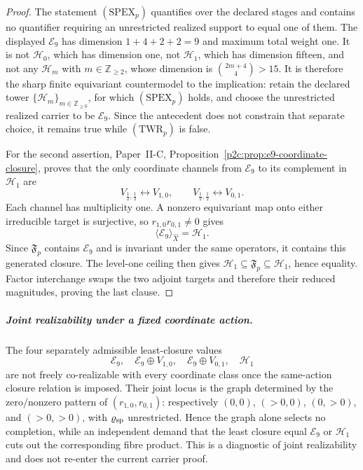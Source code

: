 \documentclass[11pt,a4paper]{article}
\begin{document}
\begin{proof}
The statement \((\mathrm{SPEX}_p)\) quantifies over the declared stages and
contains no quantifier requiring an unrestricted realized support to equal
one of them.  The displayed \(\mathcal E_9\) has dimension
\(1+4+2+2=9\) and maximum total weight one.  It is not
\(\mathcal H_0\), which has dimension one, not \(\mathcal H_1\), which has
dimension fifteen, and not any \(\mathcal H_m\) with
\(m\in\mathbb Z_{\ge2}\), whose
dimension is \(\binom{2m+4}{4}>15\).  It is therefore the sharp finite
equivariant countermodel to the implication: retain the declared tower
\(\{\mathcal H_m\}_{m\in\mathbb Z_{\ge0}}\), for which
\((\mathrm{SPEX}_p)\) holds, and
choose the unrestricted realized carrier to be \(\mathcal E_9\).  Since the
antecedent does not constrain that separate choice, it remains true while
\((\mathrm{TWR}_p)\) is false.

For the second assertion, Paper~II-C,
Proposition~\ref{p2c:prop:e9-coordinate-closure}, proves that the only
coordinate channels from
\(\mathcal E_9\) to its complement in \(\mathcal H_1\) are
\[
 V_{\frac12,\frac12}\longleftrightarrow V_{1,0},
 \qquad
 V_{\frac12,\frac12}\longleftrightarrow V_{0,1}.
\]
Each channel has multiplicity one.  A nonzero equivariant map onto either
irreducible target is surjective, so
\(r_{1,0}r_{0,1}\ne0\) gives
\[
        \langle\mathcal E_9\rangle_{\widehat X}=\mathcal H_1.
\]
Since \(\mathfrak F_p\) contains \(\mathcal E_9\) and is invariant under the
same operators, it contains this generated closure.  The level-one ceiling
then gives
\(\mathcal H_1\subseteq\mathfrak F_p\subseteq\mathcal H_1\), hence equality.
Factor interchange swaps the two adjoint targets and therefore their reduced
magnitudes, proving the last clause.
\end{proof}

\subparagraph{Joint realizability under a fixed coordinate action.}
The four separately admissible least-closure values
\[
 \mathcal E_9,\quad
 \mathcal E_9\oplus V_{1,0},\quad
 \mathcal E_9\oplus V_{0,1},\quad
 \mathcal H_1
\]
are not freely co-realizable with every coordinate class once the same-action
closure relation is imposed.  Their joint locus is the graph determined by the
zero/nonzero pattern of \((r_{1,0},r_{0,1})\): respectively
\((0,0)\), \((>0,0)\), \((0,>0)\), and \((>0,>0)\), with
\(\varrho_{\rm sp}\) unrestricted.  Hence the graph alone selects no
completion, while an independent demand that the least closure equal
\(\mathcal E_9\) or \(\mathcal H_1\) cuts out the corresponding fibre product.
This is a diagnostic of joint realizability and does not re-enter the current
carrier proof.
\end{document}
